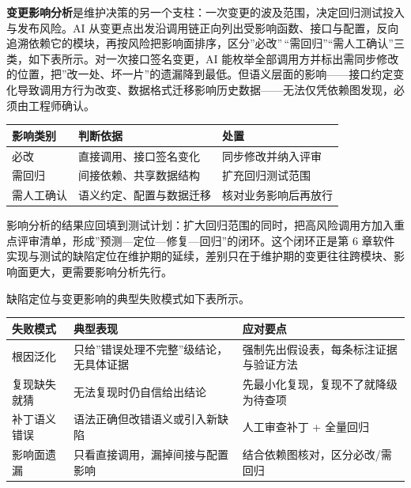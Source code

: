 \documentclass[12pt,a4paper,twoside,openany]{ctexbook}
\numberwithin{figure}{chapter}
\numberwithin{table}{chapter}
\newcounter{none}
\begin{document}
\textbf{变更影响分析}是维护决策的另一个支柱：一次变更的波及范围，决定回归测试投入与发布风险。AI
从变更点出发沿调用链正向列出受影响函数、接口与配置，反向追溯依赖它的模块，再按风险把影响面排序，区分''必改''\,``需回归''``需人工确认''三类，如下表所示。对一次接口签名变更，AI
能枚举全部调用方并标出需同步修改的位置，把''改一处、坏一片''的遗漏降到最低。但语义层面的影响------接口约定变化导致调用方行为改变、数据格式迁移影响历史数据------无法仅凭依赖图发现，必须由工程师确认。

{\def\LTcaptype{none} %
\begin{longtable}[]{@{}lll@{}}
\toprule\noalign{}
影响类别 & 判断依据 & 处置 \\
\midrule\noalign{}
\endhead
\bottomrule\noalign{}
\endlastfoot
必改 & 直接调用、接口签名变化 & 同步修改并纳入评审 \\
需回归 & 间接依赖、共享数据结构 & 扩充回归测试范围 \\
需人工确认 & 语义约定、配置与数据迁移 & 核对业务影响后再放行 \\
\end{longtable}
}

影响分析的结果应回填到测试计划：扩大回归范围的同时，把高风险调用方加入重点评审清单，形成''预测---定位---修复---回归''的闭环。这个闭环正是第
6
章软件实现与测试的缺陷定位在维护期的延续，差别只在于维护期的变更往往跨模块、影响面更大，更需要影响分析先行。

缺陷定位与变更影响的典型失败模式如下表所示。

{\def\LTcaptype{none} %
\begin{longtable}[]{@{}
  >{\raggedright\arraybackslash}p{}
  >{\raggedright\arraybackslash}p{}
  >{\raggedright\arraybackslash}p{}@{}}
\toprule\noalign{}
\begin{minipage}[b]{\linewidth}\raggedright
失败模式
\end{minipage} & \begin{minipage}[b]{\linewidth}\raggedright
典型表现
\end{minipage} & \begin{minipage}[b]{\linewidth}\raggedright
应对要点
\end{minipage} \\
\midrule\noalign{}
\endhead
\bottomrule\noalign{}
\endlastfoot
根因泛化 & 只给''错误处理不完整''级结论，无具体证据 &
强制先出假设表，每条标注证据与验证方法 \\
复现缺失就猜 & 无法复现时仍自信给出结论 &
先最小化复现，复现不了就降级为待查项 \\
补丁语义错误 & 语法正确但改错语义或引入新缺陷 & 人工审查补丁 +
全量回归 \\
影响面遗漏 & 只看直接调用，漏掉间接与配置影响 &
结合依赖图核对，区分必改/需回归 \\
\end{longtable}
}
\end{document}
